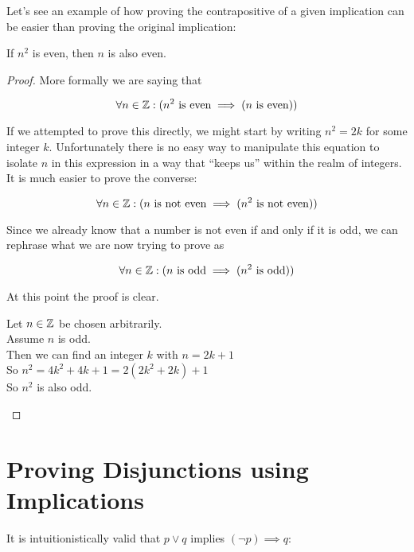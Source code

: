 Let's see an example of how proving the contrapositive of a given implication can be easier than proving the original implication:

\begin{example}
		If $n^2$ is even, then $n$ is also even.
		
		\begin{proof}
				More formally we are saying that 
				
				\[
				\forall n \in \mathbb{Z}: (n^2 \textrm{ is even} \implies (n \textrm{ is even}))
				\]
				
				If we attempted to prove this directly, we might start by writing $n^2 = 2k$ for some integer $k$.  Unfortunately there is no easy way to manipulate this equation to isolate $n$ in this expression in a way that ``keeps us'' within the realm of integers.  It is much easier to prove the converse:
				
				\[
				\forall n \in \mathbb{Z}: (n\textrm{ is not even} \implies (n^2 \textrm{ is not even}))
				\]
				
				Since we already know that a number is not even if and only if it is odd, we can rephrase what we are now trying to prove as
				
				\[
				\forall n \in \mathbb{Z}: (n \textrm{ is odd} \implies (n^2 \textrm{ is odd}))
				\]
				
				At this point the proof is clear.
				
				\begin{fitch}
				\textrm{Let $n \in \mathbb{Z}$ be chosen arbitrarily.}\\
				\textrm{Assume $n$ is odd.}\\
				\fa \textrm{ Then we can find an integer $k$ with $n = 2k+1$}\\
				\fa \textrm{  So $n^2 = 4k^2 +4k+1 = 2(2k^2+2k) + 1$}\\
				\fa \textrm{ So $n^2$ is also odd.}
				\end{fitch}
				
			\end{proof}
	\end{example}

\section{Proving Disjunctions using Implications}

It is intuitionistically valid that $p \vee q$ implies $(\neg p) \implies q$:

